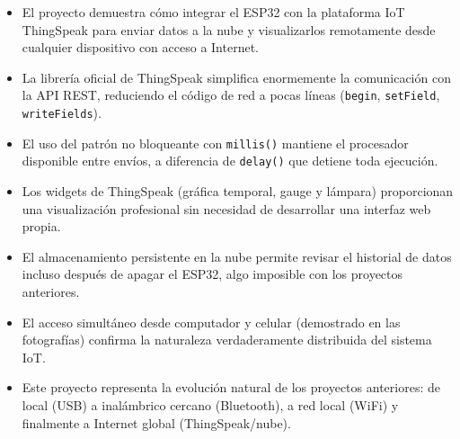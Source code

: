 \documentclass[12pt,a4paper]{article}
\begin{document}
\begin{itemize}
    \item El proyecto demuestra cómo integrar el ESP32 con la plataforma IoT ThingSpeak para enviar datos a la nube y visualizarlos remotamente desde cualquier dispositivo con acceso a Internet.
    \item La librería oficial de ThingSpeak simplifica enormemente la comunicación con la API REST, reduciendo el código de red a pocas líneas (\texttt{begin}, \texttt{setField}, \texttt{writeFields}).
    \item El uso del patrón no bloqueante con \texttt{millis()} mantiene el procesador disponible entre envíos, a diferencia de \texttt{delay()} que detiene toda ejecución.
    \item Los widgets de ThingSpeak (gráfica temporal, gauge y lámpara) proporcionan una visualización profesional sin necesidad de desarrollar una interfaz web propia.
    \item El almacenamiento persistente en la nube permite revisar el historial de datos incluso después de apagar el ESP32, algo imposible con los proyectos anteriores.
    \item El acceso simultáneo desde computador y celular (demostrado en las fotografías) confirma la naturaleza verdaderamente distribuida del sistema IoT.
    \item Este proyecto representa la evolución natural de los proyectos anteriores: de local (USB) a inalámbrico cercano (Bluetooth), a red local (WiFi) y finalmente a Internet global (ThingSpeak/nube).
\end{itemize}
\end{document}

